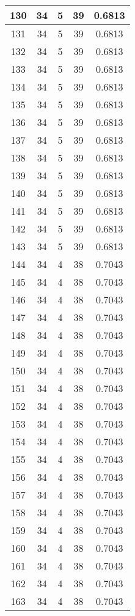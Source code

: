 \documentclass[letterpaper, 12pt]{article}
\begin{document}
\begin{longtable}{|c|c|c|c|c|}
\hline
130 & 34 & 5 & 39 & 0.6813 \\
\hline
131 & 34 & 5 & 39 & 0.6813 \\
\hline
132 & 34 & 5 & 39 & 0.6813 \\
\hline
133 & 34 & 5 & 39 & 0.6813 \\
\hline
134 & 34 & 5 & 39 & 0.6813 \\
\hline
135 & 34 & 5 & 39 & 0.6813 \\
\hline
136 & 34 & 5 & 39 & 0.6813 \\
\hline
137 & 34 & 5 & 39 & 0.6813 \\
\hline
138 & 34 & 5 & 39 & 0.6813 \\
\hline
139 & 34 & 5 & 39 & 0.6813 \\
\hline
140 & 34 & 5 & 39 & 0.6813 \\
\hline
141 & 34 & 5 & 39 & 0.6813 \\
\hline
142 & 34 & 5 & 39 & 0.6813 \\
\hline
143 & 34 & 5 & 39 & 0.6813 \\
\hline
144 & 34 & 4 & 38 & 0.7043 \\
\hline
145 & 34 & 4 & 38 & 0.7043 \\
\hline
146 & 34 & 4 & 38 & 0.7043 \\
\hline
147 & 34 & 4 & 38 & 0.7043 \\
\hline
148 & 34 & 4 & 38 & 0.7043 \\
\hline
149 & 34 & 4 & 38 & 0.7043 \\
\hline
150 & 34 & 4 & 38 & 0.7043 \\
\hline
151 & 34 & 4 & 38 & 0.7043 \\
\hline
152 & 34 & 4 & 38 & 0.7043 \\
\hline
153 & 34 & 4 & 38 & 0.7043 \\
\hline
154 & 34 & 4 & 38 & 0.7043 \\
\hline
155 & 34 & 4 & 38 & 0.7043 \\
\hline
156 & 34 & 4 & 38 & 0.7043 \\
\hline
157 & 34 & 4 & 38 & 0.7043 \\
\hline
158 & 34 & 4 & 38 & 0.7043 \\
\hline
159 & 34 & 4 & 38 & 0.7043 \\
\hline
160 & 34 & 4 & 38 & 0.7043 \\
\hline
161 & 34 & 4 & 38 & 0.7043 \\
\hline
162 & 34 & 4 & 38 & 0.7043 \\
\hline
163 & 34 & 4 & 38 & 0.7043 \\

\end{longtable}
\end{document}
